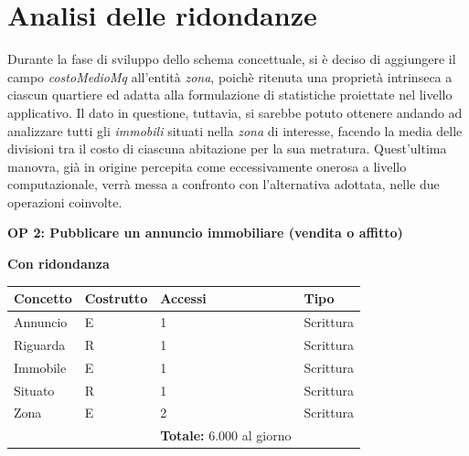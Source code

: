 \documentclass[a4paper,12pt]{report}
\begin{document}
    	\section{Analisi delle ridondanze}
            Durante la fase di sviluppo dello schema concettuale, si è deciso di aggiungere il campo \textit{costoMedioMq}
            all'entità \textit{zona}, poichè ritenuta una proprietà intrinseca a ciascun quartiere ed adatta alla formulazione
            di statistiche proiettate nel livello applicativo. Il dato in questione, tuttavia, si sarebbe potuto ottenere 
            andando ad analizzare tutti gli \textit{immobili} situati nella \textit{zona} di interesse, facendo la media delle divisioni tra il 
            costo di ciascuna abitazione per la sua metratura. Quest'ultima manovra, già in origine percepita come eccessivamente
            onerosa a livello computazionale, verrà messa a confronto con l'alternativa adottata, nelle due operazioni coinvolte. 

            \textbf{OP 2: Pubblicare un annuncio immobiliare (vendita o affitto)}
            \begin{center}
                \textbf{Con ridondanza}
            \end{center}
            \begin{table}[H]
            \centering
            \begin{tabular}{llll}
            \rowcolor{yellow!20} \textbf{Concetto} & \textbf{Costrutto} & \textbf{Accessi} & \textbf{Tipo} \\ [0.5ex] 
            \hline
            Annuncio & E & 1 & Scrittura \\ 
            Riguarda & R & 1 & Scrittura \\ 
            Immobile & E & 1 & Scrittura \\ 
            Situato & R & 1 & Scrittura \\ 
            Zona & E & 2 & Scrittura \\ 
            \hline
            \rowcolor{yellow!20}  \rowcolor{yellow!20} &   & \textbf{Totale:}  6.000 al giorno &  \\ [1ex] 
            \end{tabular}
            \end{table}
\end{document}

